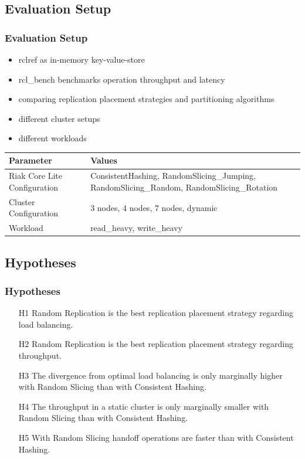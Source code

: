\documentclass[aspectratio=169]{beamer}
\begin{document}
\subsection{Evaluation Setup}
\begin{frame}
\frametitle{Evaluation Setup}
\begin{itemize}
\item rclref as in-memory key-value-store
\item rcl\_bench benchmarks operation throughput and latency
\item comparing replication placement strategies and partitioning algorithms
\item different cluster setups
\item different workloads
\end{itemize}
\begin{table}
\begin{tabularx}{\textwidth}{|l|X|}
\hline
Parameter & Values\\\hline
Riak Core Lite Configuration & ConsistentHashing, RandomSlicing\_Jumping, RandomSlicing\_Random, RandomSlicing\_Rotation\\
Cluster Configuration & 3 nodes, 4 nodes, 7 nodes, dynamic\\
Workload & read\_heavy, write\_heavy\\\hline
\end{tabularx}
\end{table}
\end{frame}

\subsection{Hypotheses}
\begin{frame}
\frametitle{Hypotheses}
\begin{itemize}
\item[H1] Random Replication is the best replication placement strategy regarding load balancing.
\item[H2] Random Replication is the best replication placement strategy regarding throughput.
\item[H3] The divergence from optimal load balancing is only marginally higher with Random Slicing than with Consistent Hashing.
\item[H4] The throughput in a static cluster is only marginally smaller with Random Slicing than with Consistent Hashing.
\item[H5] With Random Slicing handoff operations are faster than with Consistent Hashing.
\end{itemize}
\end{frame}
\end{document}
